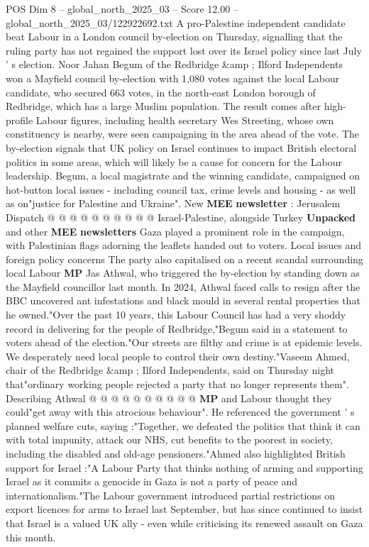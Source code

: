 \begin{textsample}{POS Dim 8 – global\_north\_2025\_03 – Score 12.00 – global\_north\_2025\_03/122922692.txt}  \label{ex:f8_pos_088}
A pro-Palestine independent candidate beat Labour in a London council by-election on Thursday, signalling that the ruling party has not regained the support lost over its Israel policy since last July ' s election.
Noor Jahan Begum of the Redbridge \&amp ; Ilford Independents won a Mayfield council by-election with 1,080 votes against the local Labour candidate, who secured 663 votes, in the north-east London borough of Redbridge, which has a large Muslim population.
The result comes after high-profile Labour figures, including health secretary Wes Streeting, whose own constituency is nearby, were seen campaigning in the area ahead of the vote.
The by-election signals that UK policy on Israel continues to impact British electoral politics in some areas, which will likely be a cause for concern for the Labour leadership.
Begum, a local magistrate and the winning candidate, campaigned on hot-button local issues - including council tax, crime levels and housing - as well as on"justice for Palestine and Ukraine".
New \textbf{MEE} \textbf{newsletter} : Jerusalem Dispatch @ @ @ @ @ @ @ @ @ @ Israel-Palestine, alongside Turkey \textbf{Unpacked} and other \textbf{MEE} \textbf{newsletters} Gaza played a prominent role in the campaign, with Palestinian flags adorning the leaflets handed out to voters.
Local issues and foreign policy concerns The party also capitalised on a recent scandal surrounding local Labour \textbf{MP} Jas Athwal, who triggered the by-election by standing down as the Mayfield councillor last month.
In 2024, Athwal faced calls to resign after the BBC uncovered ant infestations and black mould in several rental properties that he owned."Over the past 10 years, this Labour Council has had a very shoddy record in delivering for the people of Redbridge,"Begum said in a statement to voters ahead of the election."Our streets are filthy and crime is at epidemic levels.
We desperately need local people to control their own destiny."Vaseem Ahmed, chair of the Redbridge \&amp ; Ilford Independents, said on Thursday night that"ordinary working people rejected a party that no longer represents them".
Describing Athwal @ @ @ @ @ @ @ @ @ @ \textbf{MP} and Labour thought they could"get away with this atrocious behaviour".
He referenced the government ' s planned welfare cuts, saying :"Together, we defeated the politics that think it can with total impunity, attack our NHS, cut benefits to the poorest in society, including the disabled and old-age pensioners."Ahmed also highlighted British support for Israel :"A Labour Party that thinks nothing of arming and supporting Israel as it commits a genocide in Gaza is not a party of peace and internationalism."The Labour government introduced partial restrictions on export licences for arms to Israel last September, but has since continued to insist that Israel is a valued UK ally - even while criticising its renewed assault on Gaza this month.

\end{textsample}
